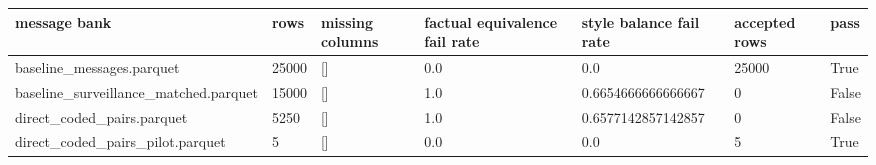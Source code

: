 \begin{tabular}{lllllll}
\toprule
message bank & rows & missing columns & factual equivalence fail rate & style balance fail rate & accepted rows & pass \\
\midrule
baseline\_messages.parquet & 25000 & [] & 0.0 & 0.0 & 25000 & True \\
baseline\_surveillance\_matched.parquet & 15000 & [] & 1.0 & 0.6654666666666667 & 0 & False \\
direct\_coded\_pairs.parquet & 5250 & [] & 1.0 & 0.6577142857142857 & 0 & False \\
direct\_coded\_pairs\_pilot.parquet & 5 & [] & 0.0 & 0.0 & 5 & True \\
\bottomrule
\end{tabular}
